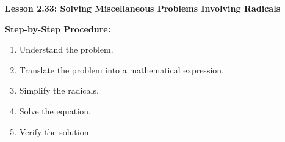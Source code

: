 \begin{center}
\textbf{Lesson 2.33: Solving Miscellaneous Problems Involving Radicals}
\end{center}

\vspace*{-1.5ex}

\noindent \textbf{Step-by-Step Procedure:}
\begin{enumerate}[noitemsep, label = \color{blue}\arabic*. ]
    \item Understand the problem.
    \item Translate the problem into a mathematical expression.
    \item Simplify the radicals.
    \item Solve the equation.
    \item Verify the solution.
\end{enumerate}

